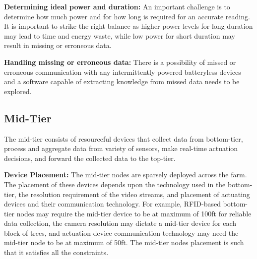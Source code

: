 \noindent
\textbf{Determining ideal power and duration:} An important challenge is to determine how much power and for how long is required for an accurate reading. It is important to strike the right balance as higher power levels for long duration may lead to time and energy waste, while low power for short duration may result in missing or erroneous data. 

\noindent
\textbf{Handling missing or erroneous data:}
 There is a possibility of missed or erroneous communication with any intermittently powered batteryless devices and a software capable of extracting knowledge from missed data needs to be explored. 


\subsection{Mid-Tier} 
The mid-tier consists of resourceful devices that collect data from bottom-tier, process and aggregate data from variety of sensors, make real-time actuation decisions, and forward the collected data to the top-tier. 

\noindent\textbf{Device Placement:} The mid-tier nodes are sparsely deployed across the farm. The placement of these devices depends upon the technology used in the bottom-tier, the resolution requirement of the video streams, and placement of actuating devices and their communication technology. For example, RFID-based bottom-tier nodes may require the mid-tier device to be at maximum of 100ft for reliable data collection, the camera resolution may dictate a mid-tier device for each block of trees, and actuation device communication technology may need the mid-tier node to be at maximum of 50ft. The mid-tier nodes placement is such that it satisfies all the constraints. 

